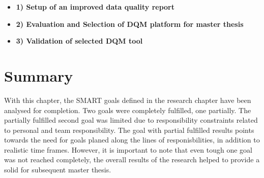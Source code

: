 \begin{itemize}
\item \textbf{1) Setup of an improved data quality report}
\item \textbf{2) Evaluation and Selection of DQM platform for master thesis}
\item \textbf{3) Validation of selected DQM tool}
\end{itemize}











\section{Summary}
With this chapter, the SMART goals defined in the research chapter have been analysed for completion. Two goals were completely fulfilled, one partially. The partially fulfilled second goal was limited due to responsibility constraints related to personal and team responsibility. The goal with partial fulfilled results points towards the need for goals planed along the lines of responisbilities, in addition to realistic time frames. However, it is important to note that even tough one goal was not reached completely, the overall results of the research helped to provide a solid for subsequent master thesis.


